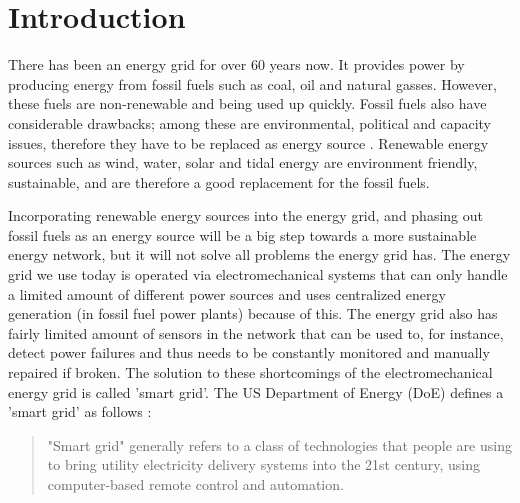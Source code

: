 \section{Introduction}
There has been an energy grid for over 60 years now. It provides power by producing energy from fossil fuels such as coal, oil and natural gasses. However, these fuels are non-renewable and being used up quickly. Fossil fuels also have considerable drawbacks; among these are environmental, political and capacity issues, therefore they have to be replaced as energy source \cite{friedman2008hot}. Renewable energy sources such as wind, water, solar and tidal energy \cite{Tromly2001} are environment friendly, sustainable, and are therefore a good replacement for the fossil fuels.

Incorporating renewable energy sources into the energy grid, and phasing out fossil fuels as an energy source will be a big step towards a more sustainable energy network, but it will not solve all problems the energy grid has. The energy grid we use today is operated via electromechanical systems that can only handle a limited amount of different power sources and uses centralized energy generation (in fossil fuel power plants) because of this. The energy grid also has fairly limited amount of sensors in the network that can be used to, for instance, detect power failures and thus needs to be constantly monitored and manually repaired if broken. The solution to these shortcomings of the electromechanical energy grid is called 'smart grid'. The US Department of Energy (DoE) defines a 'smart grid' as follows \cite{doe}: 
 
\begin{quote}
"Smart grid" generally refers to a class of technologies that people are using to bring utility electricity delivery systems into the 21st century, using computer-based remote control and automation.
\end{quote}

